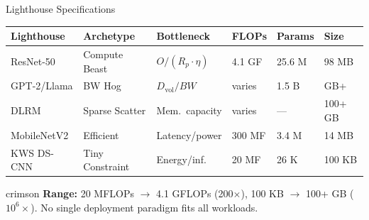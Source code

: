 \documentclass[aspectratio=169, 12pt]{beamer}
\begin{document}
\begin{frame}{Lighthouse Specifications}
\note{
%
%
}

\scriptsize
\renewcommand{\arraystretch}{1.1}
\begin{tabular}{@{}llllll@{}}
  \toprule
  \textbf{Lighthouse} & \textbf{Archetype} & \textbf{Bottleneck} & \textbf{FLOPs} & \textbf{Params} & \textbf{Size} \\
  \midrule
  ResNet-50   & Compute Beast   & $O/(R_p \!\cdot\! \eta)$ & 4.1 GF & 25.6 M & 98 MB \\
  GPT-2/Llama & BW Hog          & $D_{\text{vol}}/BW$      & varies & 1.5 B  & GB+ \\
  DLRM        & Sparse Scatter  & Mem.\ capacity           & varies & ---    & 100+ GB \\
  MobileNetV2 & Efficient       & Latency/power            & 300 MF & 3.4 M  & 14 MB \\
  KWS DS-CNN  & Tiny Constraint & Energy/inf.              & 20 MF  & 26 K   & 100 KB \\
  \bottomrule
\end{tabular}

\vspace{0.15cm}
\footnotesize
\begin{mlsyscard}{crimson}
\textbf{Range:} 20 MFLOPs $\to$ 4.1 GFLOPs (200$\times$), 100 KB $\to$ 100+ GB ($10^{6}\!\times$).
No single deployment paradigm fits all workloads.
\end{mlsyscard}

\end{frame}
\end{document}
